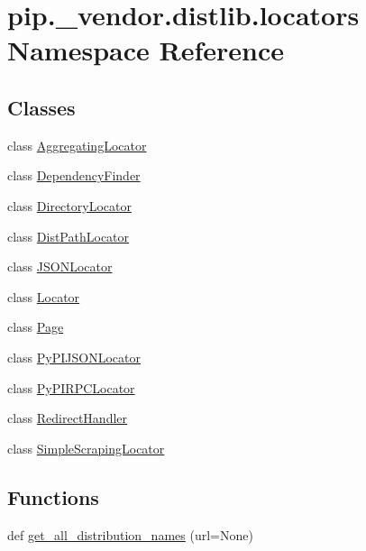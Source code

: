 \hypertarget{namespacepip_1_1__vendor_1_1distlib_1_1locators}{}\section{pip.\+\_\+vendor.\+distlib.\+locators Namespace Reference}
\label{namespacepip_1_1__vendor_1_1distlib_1_1locators}
\subsection*{Classes}
\begin{DoxyCompactItemize}
\item 
class \hyperlink{classpip_1_1__vendor_1_1distlib_1_1locators_1_1AggregatingLocator}{Aggregating\+Locator}
\item 
class \hyperlink{classpip_1_1__vendor_1_1distlib_1_1locators_1_1DependencyFinder}{Dependency\+Finder}
\item 
class \hyperlink{classpip_1_1__vendor_1_1distlib_1_1locators_1_1DirectoryLocator}{Directory\+Locator}
\item 
class \hyperlink{classpip_1_1__vendor_1_1distlib_1_1locators_1_1DistPathLocator}{Dist\+Path\+Locator}
\item 
class \hyperlink{classpip_1_1__vendor_1_1distlib_1_1locators_1_1JSONLocator}{J\+S\+O\+N\+Locator}
\item 
class \hyperlink{classpip_1_1__vendor_1_1distlib_1_1locators_1_1Locator}{Locator}
\item 
class \hyperlink{classpip_1_1__vendor_1_1distlib_1_1locators_1_1Page}{Page}
\item 
class \hyperlink{classpip_1_1__vendor_1_1distlib_1_1locators_1_1PyPIJSONLocator}{Py\+P\+I\+J\+S\+O\+N\+Locator}
\item 
class \hyperlink{classpip_1_1__vendor_1_1distlib_1_1locators_1_1PyPIRPCLocator}{Py\+P\+I\+R\+P\+C\+Locator}
\item 
class \hyperlink{classpip_1_1__vendor_1_1distlib_1_1locators_1_1RedirectHandler}{Redirect\+Handler}
\item 
class \hyperlink{classpip_1_1__vendor_1_1distlib_1_1locators_1_1SimpleScrapingLocator}{Simple\+Scraping\+Locator}
\end{DoxyCompactItemize}
\subsection*{Functions}
\begin{DoxyCompactItemize}
\item 
def \hyperlink{namespacepip_1_1__vendor_1_1distlib_1_1locators_aadf3ca6e8fd3817bf3a8219259d975d9}{get\+\_\+all\+\_\+distribution\+\_\+names} (url=None)
\end{DoxyCompactItemize}
